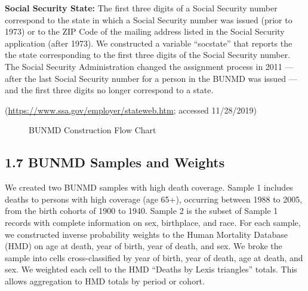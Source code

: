 \documentclass[
  11pt,
]{article}
\begin{document}
\textbf{Social Security State:} The first three digits of a Social
Security number correspond to the state in which a Social Security
number was issued (prior to 1973) or to the ZIP Code of the mailing
address listed in the Social Security application (after 1973). We
constructed a variable ``socstate'' that reports the the state
corresponding to the first three digits of the Social Security number.
The Social Security Administration changed the assignment process in
2011 --- after the last Social Security number for a person in the BUNMD
was issued --- and the first three digits no longer correspond to a
state.

(\url{https://www.ssa.gov/employer/stateweb.htm}; accessed 11/28/2019)

\begin{figure}
  \centering
  \caption{BUNMD Construction Flow Chart}
  \label{fig:tp}
\end{figure}

\newpage

\hypertarget{bunmd-samples-and-weights}{%
\subsection{1.7 BUNMD Samples and
Weights}\label{bunmd-samples-and-weights}}

We created two BUNMD samples with high death coverage. Sample 1 includes
deaths to persons with high coverage (age 65+), occurring between 1988
to 2005, from the birth cohorts of 1900 to 1940. Sample 2 is the subset
of Sample 1 records with complete information on sex, birthplace, and
race. For each sample, we constructed inverse probability weights to the
Human Mortality Database (HMD) on age at death, year of birth, year of
death, and sex. We broke the sample into cells cross-classified by year
of birth, year of death, age at death, and sex. We weighted each cell to
the HMD ``Deaths by Lexis triangles'' totals. This allows aggregation to
HMD totals by period or cohort.
\end{document}
